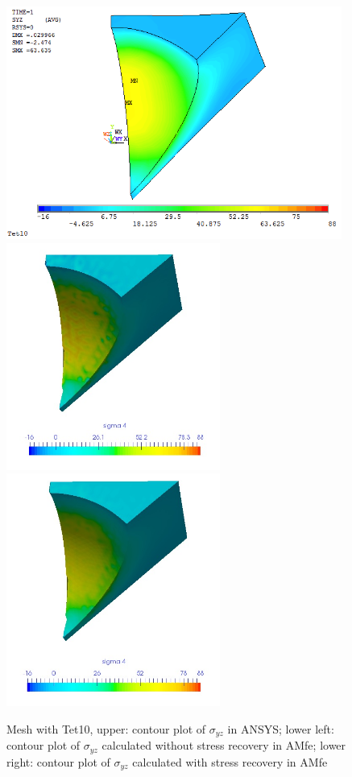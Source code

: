 \begin{figure}[htbp]
	\begin{center}
		\includegraphics[width=11cm,clip]{Tet10_Syz.png} 		
		\includegraphics[width=7cm,clip]{Tet10_Syz_PD.png} 		
		\includegraphics[width=7cm,clip]{Tet10_Syz_P.png} 		
		\caption{Mesh with Tet10, upper: contour plot of $\sigma_{yz}$ in ANSYS; lower left: contour plot of $\sigma_{yz}$ calculated without stress recovery in AMfe; lower right: contour plot of $\sigma_{yz}$ calculated with stress recovery in AMfe} \label{fig: Tet10_Syz}
	\end{center}
\end{figure}
\clearpage 

